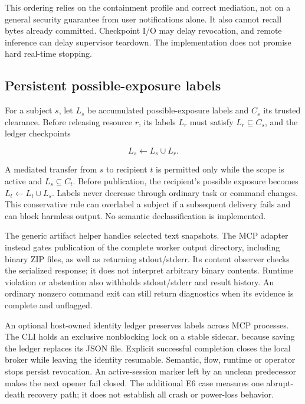 \documentclass[conference]{IEEEtran}
\begin{document}
This ordering relies on the containment profile and correct mediation, not on a general security guarantee from user notifications alone. It also cannot recall bytes already committed. Checkpoint I/O may delay revocation, and remote inference can delay supervisor teardown. The implementation does not promise hard real-time stopping.

\subsection{Persistent possible-exposure labels}\label{persistent-possible-exposure-labels}

For a subject \(s\), let \(L_s\) be accumulated possible-exposure labels and \(C_s\) its trusted clearance. Before releasing resource \(r\), its labels \(L_r\) must satisfy \(L_r \subseteq C_s\), and the ledger checkpoints

\[L_s \leftarrow L_s \cup L_r.\]

A mediated transfer from \(s\) to recipient \(t\) is permitted only while the scope is active and \(L_s \subseteq C_t\). Before publication, the recipient's possible exposure becomes \(L_t \leftarrow L_t \cup L_s\). Labels never decrease through ordinary task or command changes. This conservative rule can overlabel a subject if a subsequent delivery fails and can block harmless output. No semantic declassification is implemented.

The generic artifact helper handles selected text snapshots. The MCP adapter instead gates publication of the complete worker output directory, including binary ZIP files, as well as returning stdout/stderr. Its content observer checks the serialized response; it does not interpret arbitrary binary contents. Runtime violation or abstention also withholds stdout/stderr and result history. An ordinary nonzero command exit can still return diagnostics when its evidence is complete and unflagged.

An optional host-owned identity ledger preserves labels across MCP processes. The CLI holds an exclusive nonblocking lock on a stable sidecar, because saving the ledger replaces its JSON file. Explicit successful completion closes the local broker while leaving the identity resumable. Semantic, flow, runtime or operator stops persist revocation. An active-session marker left by an unclean predecessor makes the next opener fail closed. The additional E6 case measures one abrupt-death recovery path; it does not establish all crash or power-loss behavior.
\end{document}
